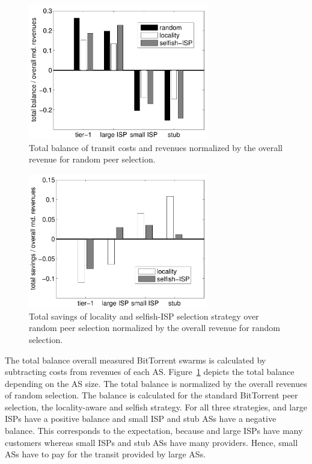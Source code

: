 \begin{figure}[bt]
	\centering
	\includegraphics[width=0.7\textwidth]{aslevel/p2p/results/figs/total_balance}
 	\caption{Total balance of transit costs and revenues normalized by the overall revenue for random peer selection.}
 	\label{fig:total_balance}
\end{figure}

\begin{figure}[bt]
	\centering
	\includegraphics[width=0.7\textwidth]{aslevel/p2p/results/figs/savings}
 	\caption{Total savings of locality and selfish-ISP selection strategy over random peer selection normalized by the overall revenue for random selection.}
 	\label{fig:savings}
\end{figure}

The total balance overall measured BitTorrent swarms is calculated by subtracting costs from revenues of each AS. Figure~\ref{fig:total_balance} depicts the total balance depending on the AS size. The total balance is normalized by the overall revenues of random selection. The balance is calculated for the standard BitTorrent peer selection, the locality-aware and selfish strategy.
For all three strategies, \tier and large ISPs have a positive balance and small ISP and stub ASs have a negative balance. This corresponds to the expectation, because \tier and large ISPs have many customers whereas small ISPs and stub ASs have many providers. Hence, small ASs have to pay for the transit provided by large ASs.


